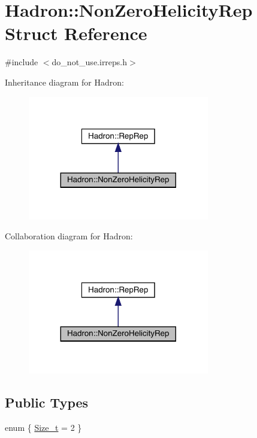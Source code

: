 \hypertarget{structHadron_1_1NonZeroHelicityRep}{}\section{Hadron\+:\+:Non\+Zero\+Helicity\+Rep Struct Reference}
\label{structHadron_1_1NonZeroHelicityRep}


{\ttfamily \#include $<$do\+\_\+not\+\_\+use.\+irreps.\+h$>$}



Inheritance diagram for Hadron\+:\nopagebreak
\begin{figure}[H]
\begin{center}
\leavevmode
\includegraphics[width=224pt]{d4/d74/structHadron_1_1NonZeroHelicityRep__inherit__graph}
\end{center}
\end{figure}


Collaboration diagram for Hadron\+:\nopagebreak
\begin{figure}[H]
\begin{center}
\leavevmode
\includegraphics[width=224pt]{d3/da9/structHadron_1_1NonZeroHelicityRep__coll__graph}
\end{center}
\end{figure}
\subsection*{Public Types}
\begin{DoxyCompactItemize}
\item 
enum \{ \mbox{\hyperlink{structHadron_1_1NonZeroHelicityRep_abc40c6d13da7a2f80fe443e54059ca9bab71456ca298f731d9f22287daee1e8db}{Size\+\_\+t}} = 2
 \}
\end{DoxyCompactItemize}
